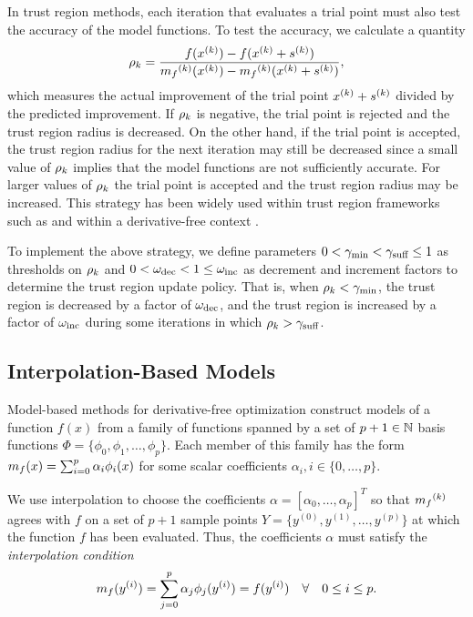 \documentclass{article}
\begin{document}
In trust region methods, each iteration that evaluates a trial point must also test the accuracy of the model functions.
To test the accuracy, we calculate a quantity
\begin{align}
\label{define_rhok}
\rho_k = \frac{f(x^{(k)}) - f(x^{(k)}+{{s}^{(k)}})}{{{m}_f}^{(k)}(x^{(k)}) - {{m}_f}^{(k)}(x^{(k)}+{{s}^{(k)}})},
\end{align}
which measures the actual improvement of the trial point $x^{(k)}+{{s}^{(k)}}$ divided by the predicted improvement.  If $\rho_k$ is negative, the trial point is rejected and the trust region radius is decreased.   On the other hand, if the trial point is accepted, the trust region radius for the next iteration may still be decreased since 
a small value of $\rho_k$ implies that the model functions are not sufficiently accurate.   For larger values of $\rho_k$ the trial point is accepted and the trust region radius may be increased.
This strategy has been widely used within trust region frameworks such as \cite{Conn:2000:TM:357813} and within a derivative-free context \cite{introduction_book}.

To implement the above strategy,  we define parameters
$
0 < \gamma_{\textrm{min}} < \gamma_{\textrm{suff}} \le 1
$
as thresholds on $\rho_k$ and
$
0 < \omega_{\text{dec}} < 1 \le \omega_{\text{inc}}
$
as decrement and increment factors to determine the trust region update policy.
That is, when $\rho_k < \gamma_{\textrm{min}}$, the trust region is decreased by a factor of $\omega_{\text{dec}}$, and the trust region is increased by a factor of $\omega_{\text{inc}}$
during some iterations in which $\rho_k > \gamma_{\textrm{suff}}$.


\subsection{Interpolation-Based Models}

\label{interpolation}

Model-based methods for derivative-free optimization construct models of a function $f(x)$ from a family of functions spanned by a set of $p + 1 \in \mathbb N$ basis functions  $\Phi = \{\phi_0, \phi_1, \ldots, \phi_p\}$. Each member of this family has the form ${{m}_f}(x) = \sum_{i=0}^p\alpha_i\phi_i(x)$ for some scalar coefficients $\alpha_i, i \in \{0, \ldots, p\}$.

We use interpolation to choose the coefficients $\alpha = [\alpha_0, \ldots, \alpha_p]^T$ so that ${{m}_f}^{(k)}$ agrees with $f$ on a set of $p+1$ sample points $Y = \{y^{(0)}, y^{(1)}, \ldots, y^{(p)}\}$ at which the function $f$ has been evaluated.
Thus, the coefficients $\alpha$ must satisfy the \emph{interpolation condition}
\begin{align}
\label{interpolation_condition}
{{m}_f}(y^{(i)}) = \sum^p_{j=0}\alpha_j\phi_j(y^{(i)}) = f(y^{(i)}) \quad \forall \quad 0 \le i \le p.
\end{align}
\end{document}
